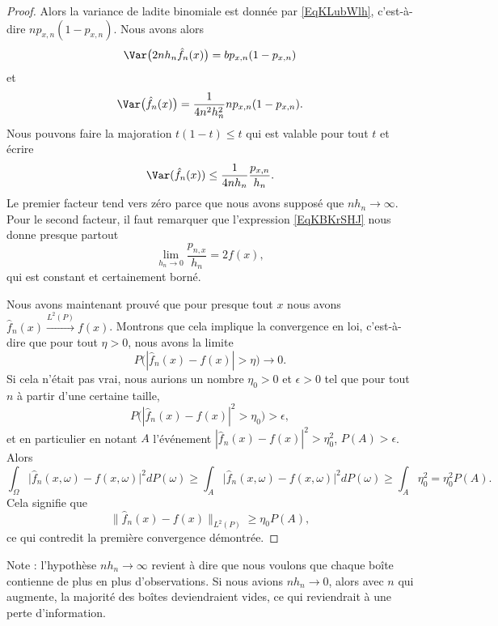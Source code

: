 \begin{proof}
	Alors la variance de ladite binomiale est donnée par \eqref{EqKLubWlh}, c'est-à-dire \( np_{x,n}(1-p_{x,n})\). Nous avons alors
	\begin{equation}
		\Var\big( 2nh_n\hat f_n(x) \big)=bp_{x,n}(1-p_{x,n})
	\end{equation}
	et
	\begin{equation}
		\Var\big( \hat f_n(x) \big)=\frac{1}{ 4n^2h_n^2 }np_{x,n}(1-p_{x,n}).
	\end{equation}
	Nous pouvons faire la majoration \( t(1-t)\leq t\) qui est valable pour tout \( t\) et écrire
	\begin{equation}
		\Var(\hat f_n(x))\leq \frac{1}{ 4nh_n }\frac{ p_{x,n} }{ h_n }.
	\end{equation}
	Le premier facteur tend vers zéro parce que nous avons supposé que \( nh_n\to \infty\). Pour le second facteur, il faut remarquer que l'expression \eqref{EqKBKrSHJ} nous donne presque partout
	\begin{equation}
		\lim_{h_n\to 0} \frac{ p_{n,x} }{ h_n }=2f(x),
	\end{equation}
	qui est constant et certainement borné.

	Nous avons maintenant prouvé que pour presque tout \( x\) nous avons \( \hat f_n(x)\stackrel{L^2(P)}{\to}f(x)\). Montrons que cela implique la convergence en loi, c'est-à-dire que pour tout \( \eta>0\), nous avons la limite
	\begin{equation}
		P\big( | \hat f_n(x)-f(x) |>\eta \big)\to 0.
	\end{equation}
	Si cela n'était pas vrai, nous aurions un nombre \( \eta_0>0\) et \( \epsilon>0\) tel que pour tout \( n\) à partir d'une certaine taille,
	\begin{equation}
		P\Big( | \hat f_n(x)-f(x) |^2>\eta_0 \Big)>\epsilon,
	\end{equation}
	et en particulier en notant \( A\) l'événement \( | \hat f_n(x)-f(x) |^2>\eta_0^2\), \( P(A)>\epsilon\). Alors
	\begin{equation}
		\int_{\Omega}\big| \hat f_n(x,\omega)-f(x,\omega) \big|^2dP(\omega)\geq \int_A\big| \hat f_n(x,\omega)-f(x,\omega) \big|^2dP(\omega)\geq\int_A\eta_0^2=\eta_0^2P(A).
	\end{equation}
	Cela signifie que
	\begin{equation}
		\| \hat f_n(x)-f(x) \|_{L^2(P)}\geq \eta_0P(A),
	\end{equation}
	ce qui contredit la première convergence démontrée.
\end{proof}
Note : l'hypothèse \( nh_n\to\infty\) revient à dire que nous voulons que chaque boîte contienne de plus en plus d'observations. Si nous avions \( nh_n\to 0\), alors avec \( n\) qui augmente, la majorité des boîtes deviendraient vides, ce qui reviendrait à une perte d'information.

